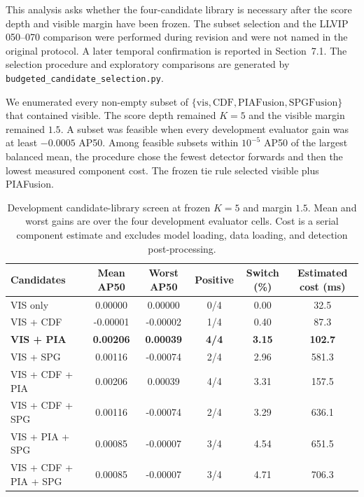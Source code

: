 \documentclass[11pt]{article}
\begin{document}
This analysis asks whether the four-candidate library is necessary after the
score depth and visible margin have been frozen. The subset selection and the
LLVIP 050--070 comparison were performed during revision and were not named in
the original protocol. A later temporal confirmation is reported in
Section~7.1. The selection procedure and exploratory comparisons are generated
by \texttt{budgeted\_candidate\_selection.py}.

We enumerated every non-empty subset of
\(\{\mathrm{vis},\mathrm{CDF},\mathrm{PIAFusion},\mathrm{SPGFusion}\}\) that
contained visible. The score depth remained \(K=5\) and the visible margin
remained \(1.5\). A subset was feasible when every development evaluator gain
was at least \(-0.0005\) AP50. Among feasible subsets within \(10^{-5}\) AP50
of the largest balanced mean, the procedure chose the fewest detector forwards
and then the lowest measured component cost. The frozen tie rule selected
visible plus PIAFusion.

\begin{table}[ht]
\centering
\small
\setlength{\tabcolsep}{3pt}
\caption{Development candidate-library screen at frozen \(K=5\) and
margin \(1.5\). Mean and worst gains are over the four development evaluator
cells. Cost is a serial component estimate and excludes model loading, data
loading, and detection post-processing.}
\label{tab:budget-selection-dev}
\begin{tabular}{@{}lccccc@{}}
\toprule
Candidates & Mean AP50 & Worst AP50 & Positive &
Switch (\%) & Estimated cost (ms) \\
\midrule
VIS only & 0.00000 & 0.00000 & 0/4 & 0.00 & 32.5 \\
VIS + CDF & -0.00001 & -0.00002 & 1/4 & 0.40 & 87.3 \\
\textbf{VIS + PIA} & \textbf{0.00206} & \textbf{0.00039} & \textbf{4/4} &
\textbf{3.15} & \textbf{102.7} \\
VIS + SPG & 0.00116 & -0.00074 & 2/4 & 2.96 & 581.3 \\
VIS + CDF + PIA & 0.00206 & 0.00039 & 4/4 & 3.31 & 157.5 \\
VIS + CDF + SPG & 0.00116 & -0.00074 & 2/4 & 3.29 & 636.1 \\
VIS + PIA + SPG & 0.00085 & -0.00007 & 3/4 & 4.54 & 651.5 \\
VIS + CDF + PIA + SPG & 0.00085 & -0.00007 & 3/4 & 4.71 & 706.3 \\
\bottomrule
\end{tabular}
\end{table}
\end{document}
